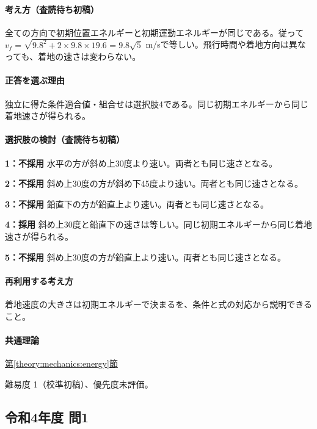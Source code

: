 \paragraph{考え方（査読待ち初稿）} 全ての方向で初期位置エネルギーと初期運動エネルギーが同じである。従って\(v_f=\sqrt{9.8^2+2\times9.8\times19.6}=9.8\sqrt5\) m/sで等しい。飛行時間や着地方向は異なっても、着地の速さは変わらない。

\paragraph{正答を選ぶ理由} 独立に得た条件適合値・組合せは選択肢4である。同じ初期エネルギーから同じ着地速さが得られる。

\paragraph{選択肢の検討（査読待ち初稿）}

\noindent\textbf{1：不採用} 水平の方が斜め上30度より速い。両者とも同じ速さとなる。\par

\noindent\textbf{2：不採用} 斜め上30度の方が斜め下45度より速い。両者とも同じ速さとなる。\par

\noindent\textbf{3：不採用} 鉛直下の方が鉛直上より速い。両者とも同じ速さとなる。\par

\noindent\textbf{4：採用} 斜め上30度と鉛直下の速さは等しい。同じ初期エネルギーから同じ着地速さが得られる。\par

\noindent\textbf{5：不採用} 斜め上30度の方が鉛直上より速い。両者とも同じ速さとなる。\par

\paragraph{再利用する考え方} 着地速度の大きさは初期エネルギーで決まるを、条件と式の対応から説明できること。

\paragraph{共通理論} \hyperref[theory:mechanics:energy]{第\ref*{theory:mechanics:energy}節}

\par 難易度 1（校準初稿）、優先度未評価。

\subsection{令和4年度 問1}
\label{q:r04-reg-applied-01}


